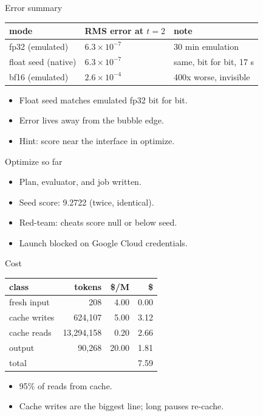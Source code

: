 \documentclass[10pt]{beamer}
\begin{document}
\begin{frame}{Error summary}
\begin{tabular}{@{}lll@{}}
\toprule
mode & RMS error at $t=2$ & note \\
\midrule
fp32 (emulated) & $6.3\times10^{-7}$ & 30 min emulation \\
float seed (native) & $6.3\times10^{-7}$ & same, bit for bit, 17 s \\
bf16 (emulated) & $2.6\times10^{-4}$ & 400x worse, invisible \\
\bottomrule
\end{tabular}
\vspace{0.5em}
\begin{itemize}
\item Float seed matches emulated fp32 bit for bit.
\item Error lives away from the bubble edge.
\item Hint: score near the interface in optimize.
\end{itemize}
\end{frame}

\begin{frame}{Optimize so far}
\begin{itemize}
\item Plan, evaluator, and job written.
\item Seed score: 9.2722 (twice, identical).
\item Red-team: cheats score null or below seed.
\item Launch blocked on Google Cloud credentials.
\end{itemize}
\end{frame}

\begin{frame}{Cost}
\begin{tabular}{@{}lrrr@{}}
\toprule
class & tokens & \$/M & \$ \\
\midrule
fresh input & 208 & 4.00 & 0.00 \\
cache writes & 624,107 & 5.00 & 3.12 \\
cache reads & 13,294,158 & 0.20 & 2.66 \\
output & 90,268 & 20.00 & 1.81 \\
\midrule
total & & & 7.59 \\
\bottomrule
\end{tabular}
\vspace{0.5em}
\begin{itemize}
\item 95\% of reads from cache.
\item Cache writes are the biggest line; long pauses re-cache.
\end{itemize}
\end{frame}
\end{document}
